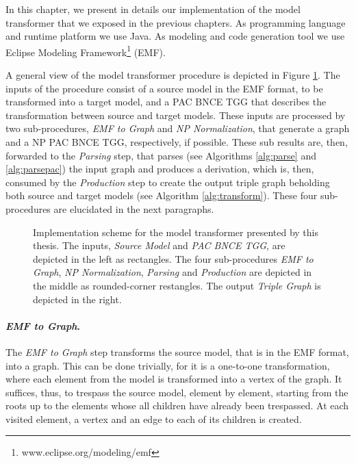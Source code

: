 In this chapter, we present in details our implementation of the model transformer that we exposed in the previous chapters. As programming language and runtime platform we use Java. As modeling and code generation tool we use Eclipse Modeling Framework\footnote{www.eclipse.org/modeling/emf} (EMF).

A general view of the model transformer procedure is depicted in Figure \ref{fig:implementation-scheme}. The inputs of the procedure consist of a source model in the EMF format, to be transformed into a target model, and a PAC BNCE TGG that describes the transformation between source and target models. These inputs are processed by two sub-procedures, \emph{EMF to Graph} and \emph{NP Normalization}, that generate a graph and a NP PAC BNCE TGG, respectively, if possible. These sub results are, then, forwarded to the \emph{Parsing} step, that parses (see Algorithms \ref{alg:parse} and \ref{alg:parsepac}) the input graph and produces a derivation, which is, then, consumed by the \emph{Production} step to create the output triple graph beholding both source and target models (see Algorithm \ref{alg:transform}). These four sub-procedures are elucidated in the next paragraphs.

\begin{figure}[h]
	
	\caption{Implementation scheme for the model transformer presented by this thesis. The inputs, \emph{Source Model} and \emph{PAC BNCE TGG}, are depicted in the left as rectangles. The four sub-procedures \emph{EMF to Graph}, \emph{NP Normalization}, \emph{Parsing} and \emph{Production} are depicted in the middle as rounded-corner restangles. The output \emph{Triple Graph} is depicted in the right.}
	\label{fig:implementation-scheme}
\end{figure}

\paragraph*{\emph{EMF to Graph}.} The \emph{EMF to Graph} step transforms the source model, that is in the EMF format, into a graph. This can be done trivially, for it is a one-to-one transformation, where each element from the model is transformed into a vertex of the graph. It suffices, thus, to trespass the source model, element by element, starting from the roots up to the elements whose all children have already been trespassed. At each visited element, a vertex and an edge to each of its children is created.

